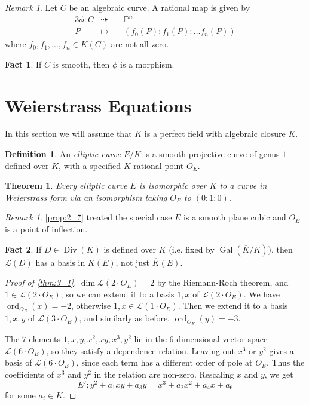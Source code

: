 \documentclass[11pt]{article}
\theoremstyle{definition}
\newtheorem*{definition*}{Definition}
\newtheorem*{fact}{Fact}
\theoremstyle{plain}
\newtheorem{theorem}[definition]{Theorem}
\theoremstyle{remark}
\newtheorem{remark}[definition]{Remark}
\newtheorem*{remark*}{Remark}
\DeclareMathOperator{\Gal}{Gal}
\DeclareMathOperator{\ord}{ord}
\DeclareMathOperator{\Div}{Div}
\newcommand{\PP}{\mathbb{P}}
\newcommand{\cL}{\mathcal{L}}
\begin{document}
\begin{remark}\label{rem:2_9}
    Let $C$ be an algebraic curve. A rational map is given by
    \begin{alignat*}{3}
        \phi : C &\dashrightarrow\,\,&& \PP^n\\
        P &\longmapsto&& (f_0(P) : f_1(P) : \ldots f_n(P))
    \end{alignat*}
    where $f_0, f_1, \ldots, f_n \in K(C)$ are not all zero.
\end{remark}
\begin{fact}
    If $C$ is smooth, then $\phi$ is a morphism.
\end{fact}

\section{Weierstrass Equations}

In this section we will assume that $K$ is a perfect field with algebraic closure $\overline{K}$.

\begin{definition*}
    An \emph{elliptic curve} $E/K$ is a smooth projective curve of genus $1$ defined over $K$, with a specified $K$-rational point $O_E$.
\end{definition*}

\begin{theorem}\label{thm:3_1}
    Every elliptic curve $E$ is isomorphic over $K$ to a curve in Weierstrass form via an isomorphism taking $O_E$ to $(0:1:0)$.
\end{theorem}

\begin{remark*}
    \autoref{prop:2_7} treated the special case $E$ is a smooth plane cubic and $O_E$ is a point of inflection.
\end{remark*}

\begin{fact}
    If $D \in \Div(K)$ is defined over $K$ (i.e. fixed by $\Gal(\overline{K}/K)$), then $\cL(D)$ has a basis in $K(E)$, not just $\overline{K}(E)$.
\end{fact}

\begin{proof}[Proof of \autoref{thm:3_1}]
    $\dim \cL(2 \cdot O_E) = 2$ by the Riemann-Roch theorem, and $1 \in \cL(2 \cdot O_E)$, so we can extend it to a basis $1, x$ of $\cL(2 \cdot O_E)$. We have $\ord_{O_E}(x) = -2$, otherwise $1, x \in \cL(1 \cdot O_E)$. Then we extend it to a basis $1,x,y$ of $\cL(3 \cdot O_E)$, and similarly as before, $\ord_{O_E}(y) = -3$.

    The $7$ elements $1,x,y,x^2,xy,x^3,y^2$ lie in the $6$-dimensional vector space $\cL(6 \cdot O_E)$, so they satisfy a dependence relation. Leaving out $x^3$ or $y^2$ gives a basis of $\cL(6 \cdot O_E)$, since each term has a different order of pole at $O_E$. Thus the coefficients of $x^3$ and $y^2$ in the relation are non-zero. Rescaling $x$ and $y$, we get
    \begin{equation*}
        E' : y^2 + a_1xy + a_3 y = x^3 + a_2x^2 + a_4x + a_6
    \end{equation*}
    for some $a_i \in K$.
\end{proof}
\end{document}
